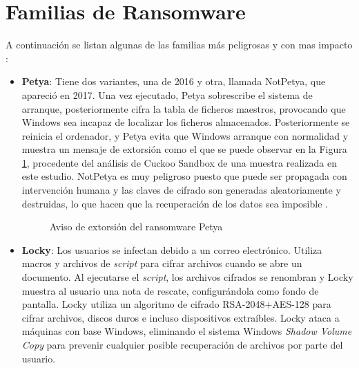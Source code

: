 \section{Familias de Ransomware}\label{sec:2-5}
\noindent A continuación se listan algunas de las familias más peligrosas y con mas impacto \cite{histRansom} \cite{smartech}:
\begin{itemize}
    
    \item \textbf{Petya}: Tiene dos variantes, una de 2016 y otra, llamada NotPetya, que apareció en 2017. Una vez ejecutado, Petya sobrescribe el sistema de arranque, posteriormente cifra la tabla de ficheros maestros, provocando que Windows sea incapaz de localizar los ficheros almacenados. Posteriormente se reinicia el ordenador, y Petya evita que Windows arranque con normalidad y muestra un mensaje de extorsión como el que se puede observar en la Figura \ref{fig:im5}, procedente del análisis de Cuckoo Sandbox de una muestra realizada en este estudio.
    NotPetya es muy peligroso puesto que puede ser propagada con intervención humana y las claves de cifrado son generadas aleatoriamente y destruidas, lo que hacen que la recuperación de los datos sea imposible \cite{ransommasive}.
    \begin{figure}[htb]
    \begin{center}
    {}
    \end{center}
    \caption{Aviso de extorsión del ransomware Petya}
    \label{fig:im5}
    \end{figure}
    
    \item \textbf{Locky}: Los usuarios se infectan debido a un correo electrónico. Utiliza macros y archivos de \textit{script} para cifrar archivos cuando se abre un documento. Al ejecutarse el \textit{script}, los archivos cifrados se renombran y Locky muestra al usuario una nota de rescate, configurándola como fondo de pantalla. Locky utiliza un algoritmo de cifrado \gls{RSA}-2048+\gls{AES}-128 para cifrar archivos, discos duros e incluso dispositivos extraíbles. Locky ataca a máquinas con base Windows, eliminando el sistema Windows \textit{Shadow Volume Copy} para prevenir cualquier posible recuperación de archivos por parte del usuario.
    

\end{itemize}
